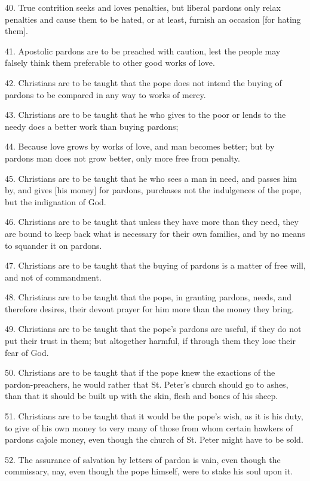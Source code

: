 40. True contrition seeks and loves penalties, but liberal pardons only
relax penalties and cause them to be hated, or at least, furnish an
occasion [for hating them].

41. Apostolic pardons are to be preached with caution, lest the people
may falsely think them preferable to other good works of love.

42. Christians are to be taught that the pope does not intend the
buying of pardons to be compared in any way to works of mercy.

43. Christians are to be taught that he who gives to the poor or lends
to the needy does a better work than buying pardons;

44. Because love grows by works of love, and man becomes better; but by
pardons man does not grow better, only more free from penalty.

45. Christians are to be taught that he who sees a man in need, and
passes him by, and gives [his money] for pardons, purchases not the
indulgences of the pope, but the indignation of God.

46. Christians are to be taught that unless they have more than they
need, they are bound to keep back what is necessary for their own
families, and by no means to squander it on pardons.

47. Christians are to be taught that the buying of pardons is a matter
of free will, and not of commandment.

48. Christians are to be taught that the pope, in granting pardons,
needs, and therefore desires, their devout prayer for him more than the
money they bring.

49. Christians are to be taught that the pope's pardons are useful, if
they do not put their trust in them; but altogether harmful, if through
them they lose their fear of God.

50. Christians are to be taught that if the pope knew the exactions of
the pardon-preachers, he would rather that St. Peter's church should
go to ashes, than that it should be built up with the skin, flesh and
bones of his sheep.

51. Christians are to be taught that it would be the pope's wish, as it
is his duty, to give of his own money to very many of those from whom
certain hawkers of pardons cajole money, even though the church of St.
Peter might have to be sold.

52. The assurance of salvation by letters of pardon is vain, even
though the commissary, nay, even though the pope himself, were to stake
his soul upon it.

